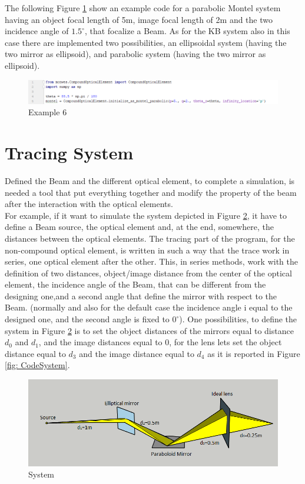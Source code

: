 The following Figure \ref{fig: CodeMontel} show an example code for a parabolic Montel system having an object focal length of 5m, image focal length of 2m and the two incidence angle of $1.5^{\circ} $, that focalize a Beam. As for the KB system also in this case there are implemented two possibilities, an ellipsoidal system (having the two mirror as ellipsoid), and parabolic system (having the two mirror as ellipsoid). 
\begin{figure}[H]
%
\centering
%
\includegraphics[width=1.\textwidth]{Immagini/Chapter3/CodeMontel}
%
\caption{Example 6}
%
\label{fig: CodeMontel}
%
\end{figure}
%
\section{Tracing System}
Defined the Beam and the different optical element, to complete a simulation, is needed a tool that put everything together and modify the property of the beam after the interaction with the optical elements.
\\
For example, if it want to simulate the system depicted in Figure \ref{fig: System}, it have to define a Beam source, the optical element and, at the end, somewhere, the distances between the optical elements. The tracing part of the program, for the non-compound optical element, is written in such a way that the trace work in series, one optical element after the other. This, in series methods, work with the definition of two distances, object/image distance from the center of the optical element, the incidence angle of the Beam, that can be different from the designing one,and a second angle that define the mirror with respect to the Beam. (normally and also for the default case the incidence angle i equal to the designed one, and the second angle is fixed to $0^{\circ} $). One possibilities, to define the system in Figure \ref{fig: System} is to set the object distances of the mirrors equal to distance $d_0 $ and $d_1 $, and the image distances equal to $0 $, for the lens lets set the object distance equal to $d_3 $ and the image distance equal to $d_4 $ as it is reported in Figure \ref{fig: CodeSystem}.
\begin{figure}[H]
%
\centering
%
\includegraphics[width=1.0\textwidth]{Immagini/Chapter3/Cattura}
%
\caption{System}
%
\label{fig: System}
%
\end{figure}
